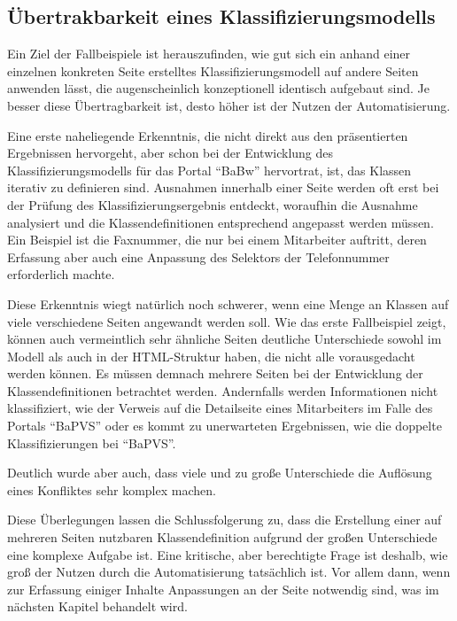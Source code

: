 \subsection{Übertrakbarkeit eines Klassifizierungsmodells}
    Ein Ziel der Fallbeispiele ist herauszufinden,
    wie gut sich ein anhand einer einzelnen konkreten Seite
    erstelltes Klassifizierungsmodell auf andere Seiten anwenden lässt,
    die augenscheinlich konzeptionell identisch aufgebaut sind.
    Je besser diese Übertragbarkeit ist,
    desto höher ist der Nutzen der Automatisierung.

    Eine erste naheliegende Erkenntnis,
    die nicht direkt aus den präsentierten Ergebnissen hervorgeht,
    aber schon bei der Entwicklung des Klassifizierungsmodells
    für das Portal "`BaBw"' hervortrat, ist,
    das Klassen iterativ zu definieren sind.
    Ausnahmen innerhalb einer Seite werden oft erst
    bei der Prüfung des Klassifizierungsergebnis entdeckt,
    woraufhin die Ausnahme analysiert und die Klassendefinitionen
    entsprechend angepasst werden müssen.
    Ein Beispiel ist die Faxnummer, die nur bei einem Mitarbeiter auftritt,
    deren Erfassung aber auch eine Anpassung des Selektors der Telefonnummer
    erforderlich machte.

    Diese Erkenntnis wiegt natürlich noch schwerer,
    wenn eine Menge an Klassen auf viele verschiedene Seiten angewandt werden soll.
    Wie das erste Fallbeispiel zeigt,
    können auch vermeintlich sehr ähnliche Seiten deutliche Unterschiede
    sowohl im Modell als auch in der HTML-Struktur haben,
    die nicht alle vorausgedacht werden können.
    Es müssen demnach mehrere Seiten bei der Entwicklung der Klassendefinitionen
    betrachtet werden.
    Andernfalls werden Informationen nicht klassifiziert,
    wie der Verweis auf die Detailseite eines Mitarbeiters im Falle des
    Portals "`BaPVS"' oder es kommt zu unerwarteten Ergebnissen,
    wie die doppelte Klassifizierungen bei "`BaPVS"'.

    Deutlich wurde aber auch, dass viele und zu große Unterschiede
    die Auflösung eines Konfliktes sehr komplex machen.

    Diese Überlegungen lassen die Schlussfolgerung zu,
    dass die Erstellung einer auf mehreren Seiten nutzbaren
    Klassendefinition aufgrund der großen Unterschiede eine komplexe Aufgabe ist.
    Eine kritische, aber berechtigte Frage ist deshalb,
    wie groß der Nutzen durch die Automatisierung tatsächlich ist.
    Vor allem dann, wenn zur Erfassung einiger Inhalte Anpassungen an der Seite notwendig sind,
    was im nächsten Kapitel behandelt wird.

